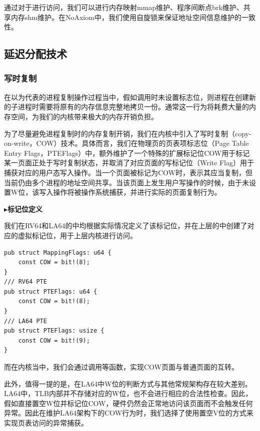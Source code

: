 \documentclass{article}
\begin{document}
通过对于进行访问，我们可以进行内存映射mmap维护、程序间断点brk维护、共享内存shm维护。在NoAxiom中，我们使用自旋锁来保证地址空间信息维护的一致性。


\subsection{延迟分配技术}

\subsubsection{写时复制}

在以为代表的进程复制操作过程当中，假如调用时未设置标志位，则进程在创建新的子进程时需要将原有的内存信息完整地拷贝一份。通常这一行为将耗费大量的内存空间，为我们的内核带来极大的内存开销负担。

为了尽量避免进程复制时的内存复制开销，我们在内核中引入了写时复制（copy-on-write，COW）技术。具体而言，我们在物理页的页表项标志位（Page Table Entry Flags，PTEFlags）中，额外维护了一个特殊的扩展标记位COW用于标记某一页面正处于写时复制状态，并取消了对应页面的写标记位（Write Flag）用于捕获对应的用户态写入操作。当一个页面被标记为COW时，表示其应当复制，但当前仍由多个进程的地址空间共享。当该页面上发生用户写操作的时候，由于未设置W位，该写入操作将被操作系统捕获，并进行实际的页面复制行为。

$\blacktriangleright$\textbf{标记位定义}

我们在RV64和LA64的中均根据实际情况定义了该标记位，并在上层的中创建了对应的虚拟标记位，用于上层内核进行访问。

\begin{lstlisting}
pub struct MappingFlags: u64 {
    const COW = bit!(8);
}
/// RV64 PTE
pub struct PTEFlags: u64 {
    const COW = bit!(8);
}
/// LA64 PTE
pub struct PTEFlags: usize {
    const COW = bit!(9);
}
\end{lstlisting}

而在内核当中，我们会通过调用等函数，实现COW页面与普通页面的互转。

此外，值得一提的是，在LA64中W位的判断方式与其他常规架构存在较大差别。LA64中，TLB内部并不存储对应的W位，也不会进行相应的合法性检查。因此，假如直接置空W位并标记位COW，硬件仍然会正常地访问该页面而不会触发任何异常。因此在维护LA64架构下的COW行为时，我们选择了使用置空V位的方式来实现页表访问的异常捕获。
\end{document}
